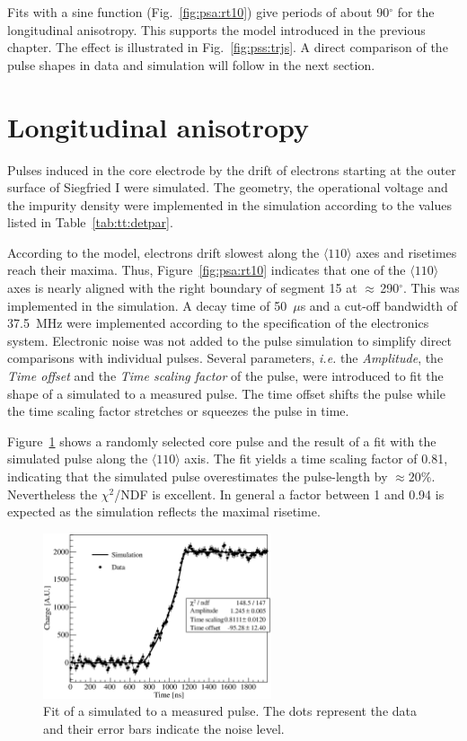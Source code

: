 Fits with a sine function (Fig.~\ref{fig:psa:rt10}) give periods of
about 90$^{\circ}$ for the longitudinal anisotropy. This supports the
model introduced in the previous chapter. The effect is illustrated in
Fig.~\ref{fig:pss:trjs}. A direct comparison of the pulse shapes in
data and simulation will follow in the next section.

\section{Longitudinal anisotropy}
\label{sec:psa:lon}
Pulses induced in the core electrode by the drift of electrons
starting at the outer surface of Siegfried I were simulated. The
geometry, the operational voltage and the impurity density were
implemented in the simulation according to the values listed in
Table~\ref{tab:tt:detpar}.

According to the model, electrons drift slowest along the $\langle 110
\rangle$ axes and risetimes reach their maxima. Thus,
Figure~\ref{fig:psa:rt10} indicates that one of the $\langle 110
\rangle$ axes is nearly aligned with the right boundary of segment 15
at $\approx$\,290$^\circ$. This was implemented in the simulation. A
decay time of 50~$\mu$s and a cut-off bandwidth of 37.5~MHz were
implemented according to the specification of the electronics
system. Electronic noise was not added to the pulse simulation to
simplify direct comparisons with individual pulses. Several
parameters, \textit{i.e.} the \emph{Amplitude}, the \emph{Time offset}
and the \emph{Time scaling factor} of the pulse, were introduced to
fit the shape of a simulated to a measured pulse. The time offset
shifts the pulse while the time scaling factor stretches or squeezes
the pulse in time.

Figure~\ref{fig:psa:s2d} shows a randomly selected core pulse and the
result of a fit with the simulated pulse along the $\langle 110
\rangle$ axis. The fit yields a time scaling factor of 0.81,
indicating that the simulated pulse overestimates the pulse-length by
$\approx 20\%$. Nevertheless the $\chi^{2}$/NDF is excellent. In
general a factor between 1 and 0.94 is expected as the simulation
reflects the maximal risetime.
\begin{figure}[htbp]
\centering
\includegraphics[width=0.6\textwidth]{PSs2d}
\caption{Fit of a simulated to a measured pulse. The dots represent
the data and their error bars indicate the noise level.}
\label{fig:psa:s2d}
\end{figure}

